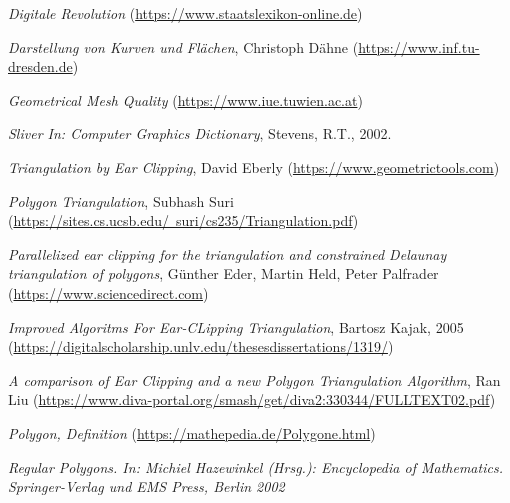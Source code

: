 \begin{thebibliography}{11}
    \raggedright
    \emph{Digitale Revolution} \break
    (\href{https://www.staatslexikon-online.de/Lexikon/Digitale_Revolution}{https://www.staatslexikon-online.de})

    \emph{Darstellung von Kurven und Flächen}, Christoph Dähne \break
    (\href{https://www.inf.tu-dresden.de/content/institutes/smt/cg/teaching/seminars/ProseminarSS08/cdaehne/ausarbeitung.pdf}{https://www.inf.tu-dresden.de})
    
    \emph{Geometrical Mesh Quality} \break
    (\href{https://www.iue.tuwien.ac.at/phd/fleischmann/node13.html#sec:geoqual}{https://www.iue.tuwien.ac.at})

    \emph{Sliver In: Computer Graphics Dictionary}, Stevens, R.T., 2002.
    
    \emph{Triangulation by Ear Clipping}, David Eberly \break 
    (\href{https://www.geometrictools.com/Documentation/TriangulationByEarClipping.pdf}{https://www.geometrictools.com})
    
    \emph{Polygon Triangulation}, Subhash Suri \break
    (\href{https://sites.cs.ucsb.edu/~suri/cs235/Triangulation.pdf}{https://sites.cs.ucsb.edu/~suri/cs235/Triangulation.pdf}) 
    
    \emph{Parallelized ear clipping for the triangulation and constrained Delaunay triangulation of polygons}, Günther Eder, Martin Held, Peter Palfrader \break
    (\href{https://www.sciencedirect.com/science/article/pii/S092577211830004X}{https://www.sciencedirect.com})

    \emph{Improved Algoritms For Ear-CLipping Triangulation}, Bartosz Kajak, 2005 \break
    (\href{https://digitalscholarship.unlv.edu/thesesdissertations/1319/}{https://digitalscholarship.unlv.edu/thesesdissertations/1319/})

    \emph{A comparison of Ear Clipping and a new Polygon Triangulation Algorithm}, Ran Liu \break
    (\href{https://www.diva-portal.org/smash/get/diva2:330344/FULLTEXT02.pdf}{https://www.diva-portal.org/smash/get/diva2:330344/FULLTEXT02.pdf})

    \emph{Polygon, Definition} \break
    (\href{https://mathepedia.de/Polygone.html}{https://mathepedia.de/Polygone.html})
    
    \emph{Regular Polygons. In: Michiel Hazewinkel (Hrsg.): Encyclopedia of Mathematics. Springer-Verlag und EMS Press, Berlin 2002}
    

\end{thebibliography}
